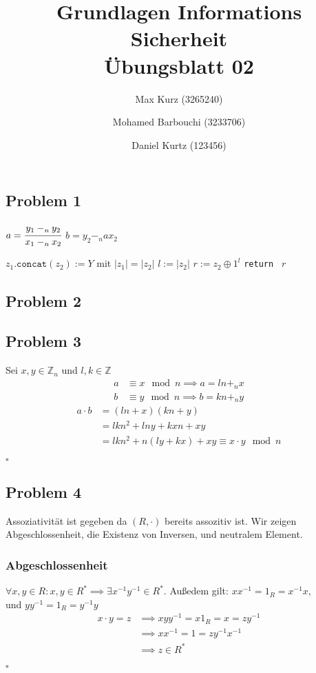 \documentclass[12pt, german]{article}
\title{Grundlagen Informations Sicherheit \\ Übungsblatt 02}
\author{Max Kurz (3265240)  \and Mohamed Barbouchi (3233706) \and Daniel Kurtz (123456)}
\date{}
\newcommand{\bewiesen}{\begin{flushright}$\square$ \end{flushright} }
\begin{document}
	\maketitle
    \subsection*{Problem 1}
    $a= \cfrac{y_1 -_n y_2}{x_1 -_n x_2}$  
    $b=y_2 -_n ax_2$
   	\begin{algorithm} 
    		\centering
    		\caption{$D(Y)$}
    		\label{Alg:1}
    		\begin{algorithmic}[1]
    			\State $z_{1}.\texttt{concat}(z_{2}) := Y$ mit $|z_1| = |z_2|$
    			\State $l := |z_2|$
    			\State $r := z_2 \oplus 1^l$
    			\State \texttt{return } $r$
    		\end{algorithmic}
    	\end{algorithm} 		
    
    \subsection*{Problem 2}
    \subsection*{Problem 3}
    	Sei  $x, y \in \mathbb{Z}_n$ und $l,k \in \mathbb{Z}$
    	\begin{align*}
    			a &\equiv x \mod n 	\implies	a = ln +_n x \\
    			b &\equiv y \mod n \implies 	b = kn +_n y
    	\end{align*}
    	\begin{align*}
    	a\cdot b &= (ln +x)(kn +y) \\
    	&=lkn^2 +lny +kxn + xy \\
    	&= lkn^2 +n(ly +kx) +xy \equiv x\cdot y \mod n
    	\end{align*}
    	\bewiesen
    
       \subsection*{Problem 4}
    	Assoziativität ist gegeben da $(R, \cdot)$ bereits assozitiv ist. Wir zeigen Abgeschlossenheit, die Existenz von Inversen, und neutralem Element. 
    	\subsubsection*{Abgeschlossenheit}
    	 $\forall x,y \in R : x,y \in R^\ast \implies \exists x^{-1} y^{-1} \in R^\ast$. 
   	 Außedem gilt: $xx^{-1} = 1_R = x^{-1}x$, \\ und $yy^{-1} = 1_R = y^{-1}y $
    	\begin{align*}
    		x \cdot y = z &\implies xyy^{-1} = x1_R=x=zy^{-1} \\
    		&\implies xx^{-1} = 1 = zy^{-1}x^{-1} \\
    			&\implies z \in R^\ast
    	\end{align*} \bewiesen
\end{document}
